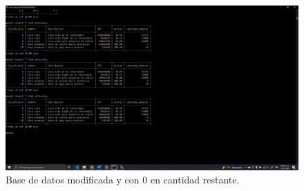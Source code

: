 \documentclass[11pt]{article}
\begin{document}
		\begin{figure}[H]
			\centering
			\includegraphics[scale=0.34]{resources/p3masconbd.png}
			\caption{Base de datos modificada y con 0 en cantidad restante.}\label{fig:picture}
		\end{figure}
\end{document}
